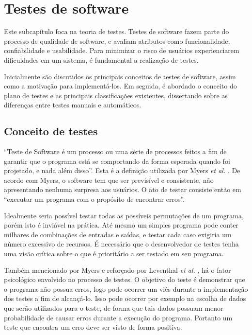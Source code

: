 \hypertarget{testes-de-software}{%
\section{Testes de software}\label{testes-de-software}}
Este subcapítulo foca na teoria de testes. Testes de software fazem parte do processo de qualidade de software, e avaliam atributos como funcionalidade, confiabilidade e usabilidade. Para minimizar o risco de usuários experienciarem dificuldades em um sistema, é fundamental a realização de testes.

Inicialmente são discutidos os principais conceitos de testes de software, assim como a motivação para implementá-los. Em seguida, é abordado o conceito do plano de testes e as principais classificações existentes, dissertando sobre as diferenças entre testes manuais e automáticos.

\hypertarget{conceito-de-testes}{%
\subsection{Conceito de testes}\label{conceito-de-testes}}

``Teste de Software é um processo ou uma série de processos feitos a fim de garantir que o programa está se comportando da forma esperada quando foi projetado, e nada além disso''. Esta é a definição utilizada por Myers \emph{et al.} \cite{myers}. De acordo com Myers, o software tem que ser previsível e consistente, não apresentando nenhuma surpresa aos usuários. O ato de testar consiste então em ``executar um programa com o propósito de encontrar erros''.

Idealmente seria possível testar todas as possíveis permutações de um programa, porém isto é inviável na prática. Até mesmo um simples programa pode conter milhares de combinações de entradas e saídas, e testar cada caso exigiria um número excessivo de recursos. É necessário que o desenvolvedor de testes tenha uma visão crítica sobre o que é prioritário a ser testado em seu programa.

Também mencionado por Myers e reforçado por Leventhal \emph{et al.} \cite{leventhal}, há o fator psicológico envolvido no processo de testes. O objetivo do teste é demonstrar que o programa não possua erros, logo pode ocorrer um viés durante a implementação dos testes a fim de alcançá-lo. Isso pode ocorrer por exemplo na escolha de dados que serão utilizados para o teste, de forma que tais dados possuam menor probabilidade de causar erros durante a execução do programa. Portanto um teste que encontra um erro deve ser visto de forma positiva.


